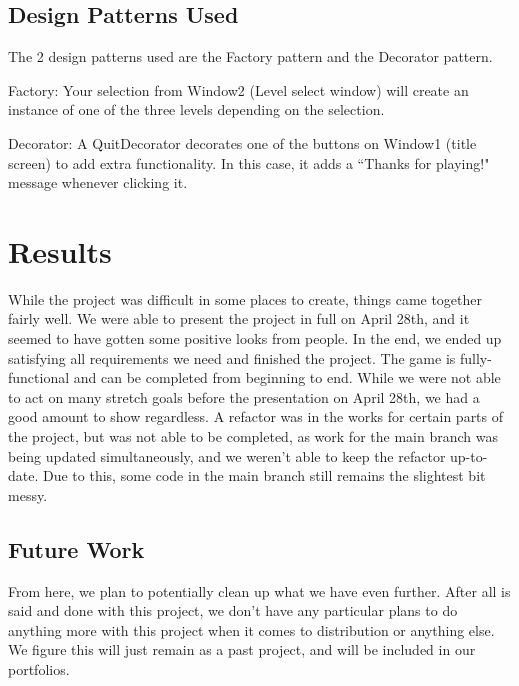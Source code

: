 \documentclass[10pt,conference,onecolumn,compsoc]{IEEEtran}
\begin{document}
\subsection{Design Patterns Used}
The 2 design patterns used are the Factory pattern and the Decorator pattern.

Factory: Your selection from Window2 (Level select window) will create an instance of one of the three levels depending on the selection.

Decorator: A QuitDecorator decorates one of the buttons on Window1 (title screen) to add extra functionality. In this case, it adds a ``Thanks for playing!" message whenever clicking it.


\section{Results}
While the project was difficult in some places to create, things came together fairly well. We were able to present the project in full on April 28th, and it seemed to have gotten some positive looks from people. In the end, we ended up satisfying all requirements we need and finished the project. The game is fully-functional and can be completed from beginning to end. While we were not able to act on many stretch goals before the presentation on April 28th, we had a good amount to show regardless. A refactor was in the works for certain parts of the project, but was not able to be completed, as work for the main branch was being updated simultaneously, and we weren't able to keep the refactor up-to-date. Due to this, some code in the main branch still remains the slightest bit messy.

\subsection{Future Work}
From here, we plan to potentially clean up what we have even further. After all is said and done with this project, we don't have any particular plans to do anything more with this project when it comes to distribution or anything else. We figure this will just remain as a past project, and will be included in our portfolios. 










\end{document}

